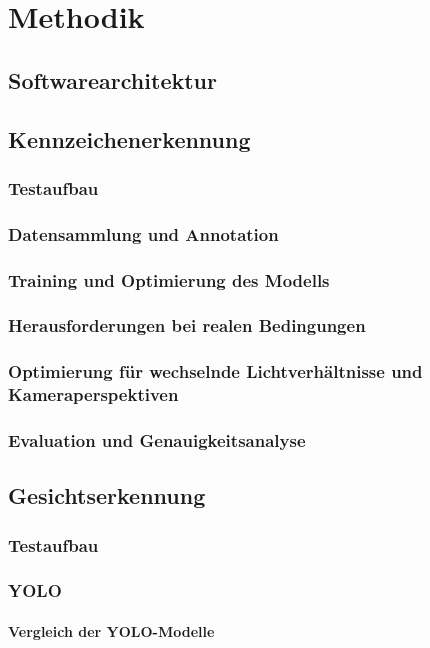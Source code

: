 \section{Methodik}
\subsection{Softwarearchitektur}
\subsection{Kennzeichenerkennung}
\subsubsection{Testaufbau}
\subsubsection{Datensammlung und Annotation}
\subsubsection{Training und Optimierung des Modells}
\subsubsection{Herausforderungen bei realen Bedingungen}
\subsubsection{Optimierung für wechselnde Lichtverhältnisse und Kameraperspektiven}
\subsubsection{Evaluation und Genauigkeitsanalyse}

\subsection{Gesichtserkennung}
\subsubsection{Testaufbau}
\subsubsection{YOLO}
\paragraph{Vergleich der YOLO-Modelle}
